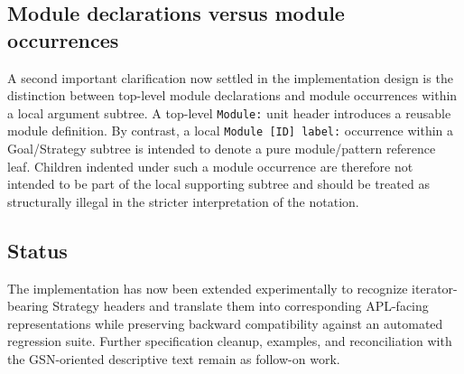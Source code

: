 \documentclass[11pt,twoside,a4paper]{article}
\begin{document}
\subsection{Module declarations versus module occurrences}

A second important clarification now settled in the implementation design is the distinction between top-level module declarations and module occurrences within a local argument subtree.
A top-level \texttt{Module:} unit header introduces a reusable module definition.
By contrast, a local \texttt{Module [ID] label:} occurrence within a Goal/Strategy subtree is intended to denote a pure module/pattern reference leaf.
Children indented under such a module occurrence are therefore not intended to be part of the local supporting subtree and should be treated as structurally illegal in the stricter interpretation of the notation.

\subsection{Status}

The implementation has now been extended experimentally to recognize iterator-bearing Strategy headers and translate them into corresponding APL-facing representations while preserving backward compatibility against an automated regression suite.
Further specification cleanup, examples, and reconciliation with the GSN-oriented descriptive text remain as follow-on work.
\end{document}
